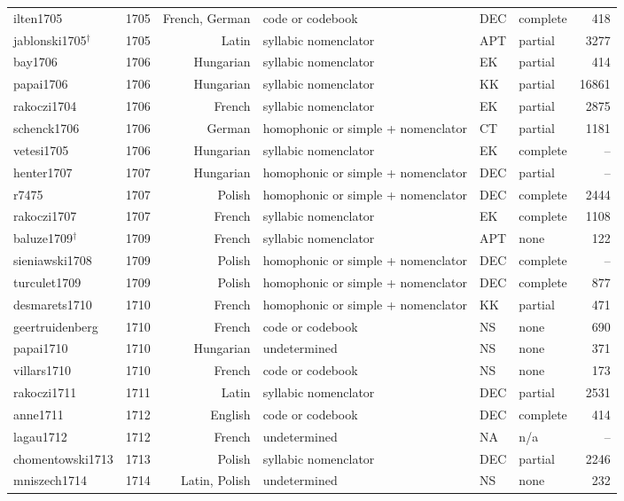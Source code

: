 {\begin{longtable}{@{}llrlllr@{}}
ilten1705 & 1705 & French, German & code or codebook & DEC & complete & 418 \\
jablonski1705$^\dagger$ & 1705 & Latin & syllabic nomenclator & APT & partial & 3277 \\
bay1706 & 1706 & Hungarian & syllabic nomenclator & EK & partial & 414 \\
papai1706 & 1706 & Hungarian & syllabic nomenclator & KK & partial & 16861 \\
rakoczi1704 & 1706 & French & syllabic nomenclator & EK & partial & 2875 \\
schenck1706 & 1706 & German & homophonic or simple + nomenclator & CT & partial & 1181 \\
vetesi1705 & 1706 & Hungarian & syllabic nomenclator & EK & complete & -- \\
henter1707 & 1707 & Hungarian & homophonic or simple + nomenclator & DEC & partial & -- \\
r7475 & 1707 & Polish & homophonic or simple + nomenclator & DEC & complete & 2444 \\
rakoczi1707 & 1707 & French & syllabic nomenclator & EK & complete & 1108 \\
baluze1709$^\dagger$ & 1709 & French & syllabic nomenclator & APT & none & 122 \\
sieniawski1708 & 1709 & Polish & homophonic or simple + nomenclator & DEC & complete & -- \\
turculet1709 & 1709 & Polish & homophonic or simple + nomenclator & DEC & complete & 877 \\
desmarets1710 & 1710 & French & homophonic or simple + nomenclator & KK & partial & 471 \\
geertruidenberg & 1710 & French & code or codebook & NS & none & 690 \\
papai1710 & 1710 & Hungarian & undetermined & NS & none & 371 \\
villars1710 & 1710 & French & code or codebook & NS & none & 173 \\
rakoczi1711 & 1711 & Latin & syllabic nomenclator & DEC & partial & 2531 \\
anne1711 & 1712 & English & code or codebook & DEC & complete & 414 \\
lagau1712 & 1712 & French & undetermined & NA & n/a & -- \\
chomentowski1713 & 1713 & Polish & syllabic nomenclator & DEC & partial & 2246 \\
mniszech1714 & 1714 & Latin, Polish & undetermined & NS & none & 232 \\

\end{longtable}}

